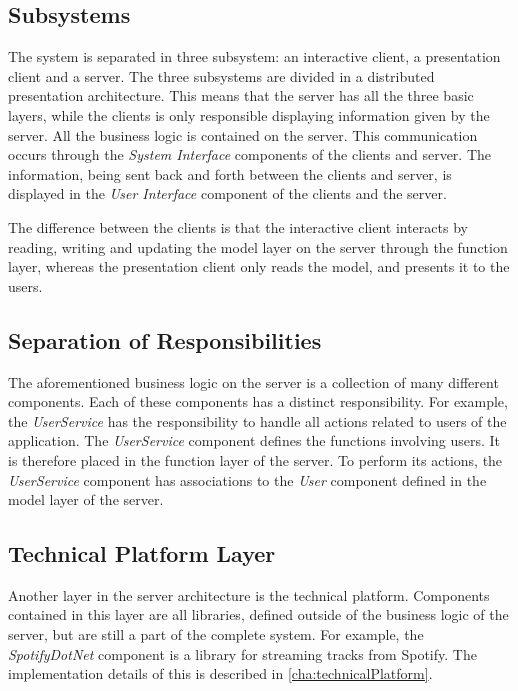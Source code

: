 \subsection{Subsystems}
The system is separated in three subsystem: an interactive client, a presentation client and a server. The three subsystems are divided in a distributed presentation architecture. This means that the server has all the three basic layers, while the clients is only responsible displaying information given by the server. All the business logic is contained on the
server. This communication occurs through the \emph{System Interface}
components of the clients and server. The information, being sent back and
forth between the clients and server, is displayed in the \emph{User Interface}
component of the clients and the server.

The difference between the clients is that the interactive client interacts by reading, writing and updating the model layer on the server through the function layer, whereas the presentation client only reads the model, and presents it to the users.

\subsection{Separation of Responsibilities}
The aforementioned business logic on the server is a collection of
many different components. Each of these components has a distinct
responsibility. For example, the \emph{UserService} has the responsibility to
handle all actions related to users of the application. The
\emph{UserService} component defines the functions involving users. It is
therefore placed in the function layer of the server. To perform its
actions, the \emph{UserService} component has associations to the \emph{User}
component defined in the model layer of the server.

\subsection{Technical Platform Layer}

Another layer in the server architecture is the
technical platform. Components contained in this layer are all
libraries, defined outside of the business logic of the server, but are
still a part of the complete system. For example, the
\emph{SpotifyDotNet} component is a library for streaming tracks from
Spotify. The implementation details of this is described in
\cref{cha:technicalPlatform}.
